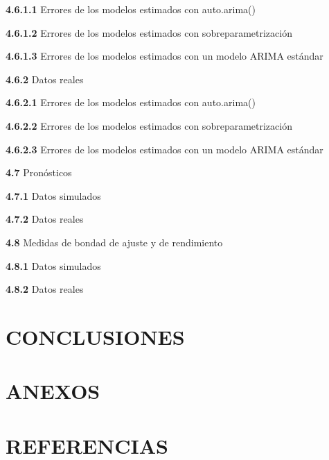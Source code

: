 \documentclass[
]{article}
\begin{document}
\textbf{4.6.1.1} Errores de los modelos estimados con auto.arima()

\textbf{4.6.1.2} Errores de los modelos estimados con
sobreparametrización

\textbf{4.6.1.3} Errores de los modelos estimados con un modelo ARIMA
estándar

\textbf{4.6.2} Datos reales

\textbf{4.6.2.1} Errores de los modelos estimados con auto.arima()

\textbf{4.6.2.2} Errores de los modelos estimados con
sobreparametrización

\textbf{4.6.2.3} Errores de los modelos estimados con un modelo ARIMA
estándar

\textbf{4.7} Pronósticos

\textbf{4.7.1} Datos simulados

\textbf{4.7.2} Datos reales

\textbf{4.8} Medidas de bondad de ajuste y de rendimiento

\textbf{4.8.1} Datos simulados

\textbf{4.8.2} Datos reales

\section{CONCLUSIONES}

\newpage

\section{ANEXOS}

\newpage

\section{REFERENCIAS}
\end{document}
